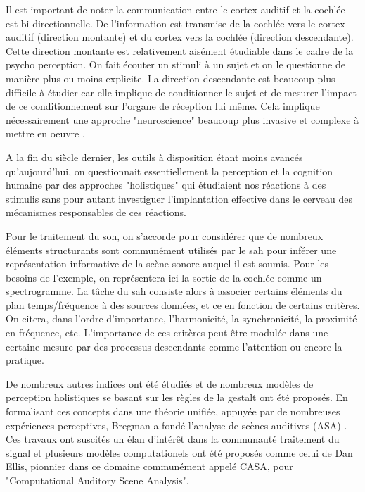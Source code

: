 Il est important de noter la communication entre le cortex auditif et la cochlée est bi directionnelle. De l'information est transmise de la cochlée vers le cortex auditif (direction montante) et du cortex vers la cochlée (direction descendante). Cette direction montante est relativement aisément étudiable dans le cadre de la psycho perception. On fait écouter un stimuli à un sujet et on le questionne de manière plus ou moins explicite. La direction descendante est beaucoup plus difficile à étudier car elle implique de conditionner le sujet et de mesurer l'impact de ce conditionnement sur l'organe de réception lui même. Cela implique nécessairement une approche "neuroscience" beaucoup plus invasive et complexe à mettre en oeuvre .

A la fin du siècle dernier, les outils à disposition étant moins avancés qu'aujourd'hui, on questionnait essentiellement la perception et la cognition humaine par des approches "holistiques" qui étudiaient nos réactions à des stimulis sans pour autant investiguer l'implantation effective dans le cerveau des mécanismes responsables de ces réactions.

Pour le traitement du son, on s'accorde pour considérer que de nombreux éléments structurants sont communément utilisés par le sah pour inférer une représentation informative de la scène sonore auquel il est soumis. Pour les besoins de l'exemple, on représentera ici la sortie de la cochlée comme un spectrogramme. La tâche du sah consiste alors à associer certains éléments du plan temps/fréquence à des sources données, et ce en fonction de certains critères.  On citera, dans l'ordre d'importance, l'harmonicité, la synchronicité, la proximité en fréquence, etc. L'importance de ces critères peut être modulée dans une certaine mesure par des processus descendants comme l'attention ou encore la pratique.

De nombreux autres indices ont été étudiés et de nombreux modèles de perception holistiques se basant sur les règles de la gestalt ont été proposés. En formalisant ces concepts dans une théorie unifiée, appuyée par de nombreuses expériences perceptives, Bregman a fondé l'analyse de scènes auditives (ASA) \cite{bregman1994auditory}. Ces travaux ont suscités un élan d'intérêt dans la communauté traitement du signal et plusieurs modèles computationels ont été proposés comme celui de Dan Ellis\cite{ellis}, pionnier dans ce domaine communément appelé CASA, pour "Computational Auditory Scene Analysis".

